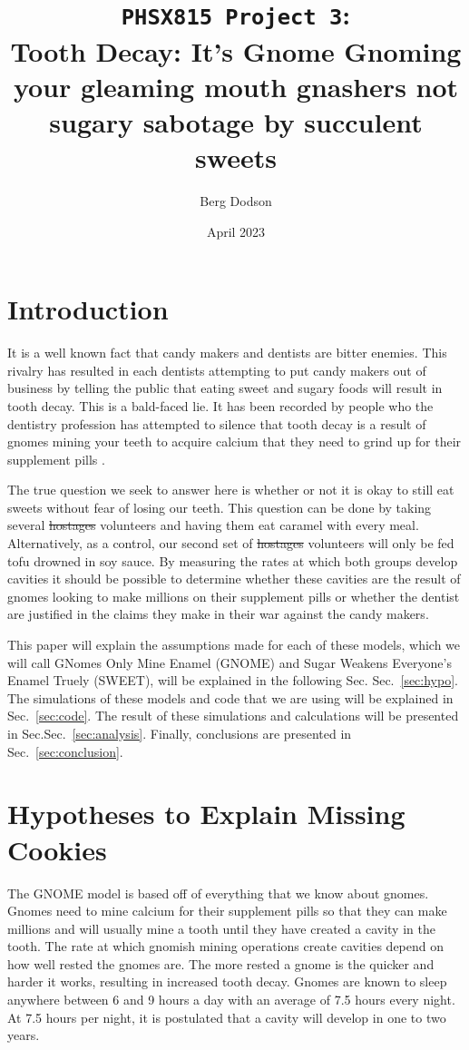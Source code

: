 \documentclass[11pt]{article}
\title{\texttt{PHSX815 Project 3}: \\ Tooth Decay: It's Gnome Gnoming your gleaming mouth gnashers not sugary sabotage by succulent sweets}
\author{Berg Dodson}
\date{April 2023}
\begin{document}
\maketitle

\section{Introduction \label{sec:intro}}

It is a well known fact that candy makers and dentists are bitter enemies. This rivalry has resulted in each dentists attempting to put candy makers out of business by telling the public that eating sweet and sugary foods will result in tooth decay. This is a bald-faced lie. It has been recorded by people who the dentistry profession has attempted to silence that tooth decay is a result of gnomes mining your teeth to acquire calcium that they need to grind up for their supplement pills \cite{gnome.dream}. 

The true question we seek to answer here is whether or not it is okay to still eat sweets without fear of losing our teeth. This question can be done by taking several \st{hostages} volunteers and having them eat caramel with every meal. Alternatively, as a control, our second set of \st{hostages} volunteers will only be fed tofu drowned in soy sauce. By measuring the rates at which both groups develop cavities it should be possible to determine whether these cavities are the result of gnomes looking to make millions on their supplement pills or whether the dentist are justified in the claims they make in their war against the candy makers. 

This paper will explain the assumptions made for each of these models, which we will call GNomes Only Mine Enamel (GNOME) and Sugar Weakens Everyone's Enamel Truely (SWEET), will be explained in the following Sec. Sec.~\ref{sec:hypo}. The simulations of these models and code that we are using will be explained in Sec.~\ref{sec:code}. The result of these simulations and calculations will be presented in Sec.Sec.~\ref{sec:analysis}. Finally, conclusions are presented in Sec.~\ref{sec:conclusion}.

\section{Hypotheses to Explain Missing Cookies \label{sec:hypo}}
The GNOME model is based off of everything that we know about gnomes. Gnomes need to mine calcium for their supplement pills so that they can make millions and will usually mine a tooth until they have created a cavity in the tooth. The rate at which gnomish mining operations create cavities depend on how well rested the gnomes are. The more rested a gnome is the quicker and harder it works, resulting in increased tooth decay. Gnomes are known to sleep anywhere between 6 and 9 hours a day with an average of 7.5 hours every night. At 7.5 hours per night, it is postulated that a cavity will develop in one to two years.
\end{document}

